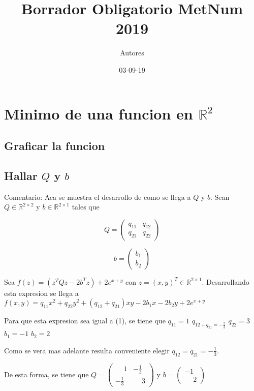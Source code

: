 \documentclass{article}
\title{Borrador Obligatorio MetNum 2019}
\date{03-09-19}
\author{Autores}
\begin{document}
    \maketitle
    \newpage

    \section{Minimo de una funcion en $\mathbb{R}^2$}

    \subsection{Graficar la funcion}

    \subsection{Hallar $Q$ y $b$}
    Comentario: Aca se muestra el desarrollo de como se llega a $Q$ y $b$.
    Sean $Q \in \mathbb{R}^{2\times2}$ y $b \in \mathbb{R}^{2\times1}$ tales que

    \begin{equation*}
        Q = \begin{pmatrix} q_{11} & q_{12} \\ q_{21} & q_{22} \end{pmatrix}
    \end{equation*}

    \begin{equation*}
        b = \begin{pmatrix} b_1 \\ b_2 \end{pmatrix}
    \end{equation*}

    
    Sea $f(z) = (z^{T}Qz - 2b^{T}z) + 2e^{x+y}$ con $z = (x,y)^T \in \mathbb{R}^{2\times1}$.
    Desarrollando esta expresion se llega a
    $f(x,y) = q_{11}x^2 + q_{22}y^2 + (q_{12} + q_{21})xy - 2b_1x - 2b_2y + 2e^{x+y}$

    Para que esta expresion sea igual a (1), se tiene que
    $q_{11} = 1$ $q_{12 + q_{21} = -\frac{2}{3}}$ $q_{22} = 3$ $b_1 = -1$ $b_2 = 2$
    
    Como se vera mas adelante resulta conveniente elegir $q_{12} = q_{21} = -\frac{1}{3}$.

    De esta forma, se tiene que
    $Q =  \begin{pmatrix} \phantom{-}1 & -\frac{1}{3} \\ -\frac{1}{3} & \phantom{-}3\end{pmatrix} $
    y
    $b = \begin{pmatrix} -1\\ \phantom{-}2 \end{pmatrix}$
\end{document}
